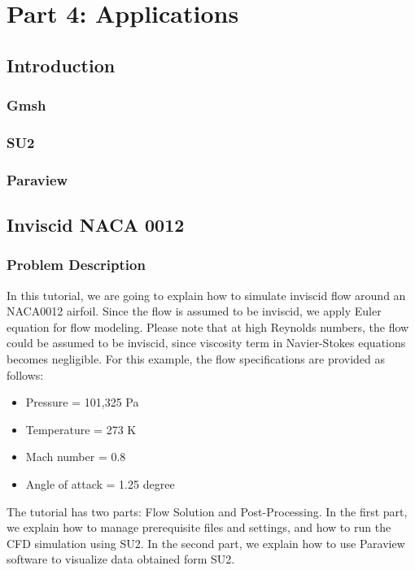 \part{Part 4: Applications}

\graphicspath{ {./Pictures/} }

\chapter{Introduction}
\section{Gmsh}
\section{SU2}
\section{Paraview}

\chapter{Inviscid NACA 0012}
\section{Problem Description}
In this tutorial, we are going to explain how to simulate inviscid flow around an NACA0012 airfoil. Since the flow is assumed to be inviscid, we apply Euler equation for flow modeling. Please note that at high Reynolds numbers, the flow could be assumed to be inviscid, since viscosity term in Navier-Stokes equations becomes negligible. For this example, the flow specifications are provided as follows:
\begin{itemize}
    \item Pressure = 101,325 Pa
    \item Temperature = 273 K
    \item Mach number = 0.8
    \item Angle of attack = 1.25 degree
\end{itemize}
The tutorial has two parts: Flow Solution and Post-Processing. In the first part, we explain how to manage prerequisite files and settings, and how to run the CFD simulation using SU2. In the second part, we explain how to use Paraview software to visualize data obtained form SU2.
